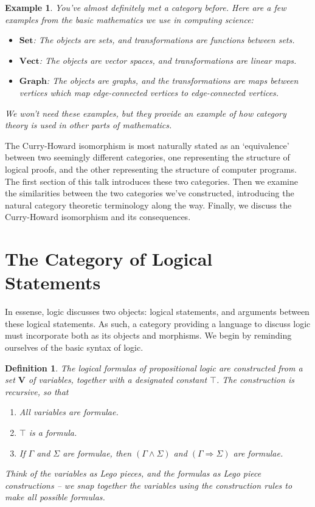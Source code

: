 \documentclass{article}
\theoremstyle{plain}
\newtheorem{definition}{Definition}
\newtheorem*{example}{Example}
\begin{document}
\begin{example}
    You've almost definitely met a category before. Here are a few examples from the basic mathematics we use in computing science:
    \begin{itemize}
        \item $\mathbf{Set}$: The objects are sets, and transformations are functions between sets.
        \item $\mathbf{Vect}$: The objects are vector spaces, and transformations are linear maps.
        \item $\mathbf{Graph}$: The objects are graphs, and the transformations are maps between vertices which map edge-connected vertices to edge-connected vertices.
    \end{itemize}
    We won't need these examples, but they provide an example of how category theory is used in other parts of mathematics.
\end{example}

The Curry-Howard isomorphism is most naturally stated as an `equivalence' between two seemingly different categories, one representing the structure of logical proofs, and the other representing the structure of computer programs. The first section of this talk introduces these two categories. Then we examine the similarities between the two categories we've constructed, introducing the natural category theoretic terminology along the way. Finally, we discuss the Curry-Howard isomorphism and its consequences.

\section{The Category of Logical Statements}

In essense, logic discusses two objects: logical statements, and arguments between these logical statements. As such, a category providing a language to discuss logic must incorporate both as its objects and morphisms. We begin by reminding ourselves of the basic syntax of logic.

\begin{definition}
    The logical formulas of propositional logic are constructed from a set $\mathbf{V}$ of variables, together with a designated constant $\top$. The construction is recursive, so that
    \begin{enumerate}
        \item All variables are formulae.
        \item $\top$ is a formula.
        \item If $\Gamma$ and $\Sigma$ are formulae, then $(\Gamma \wedge \Sigma)$ and $(\Gamma \Rightarrow \Sigma)$ are formulae.
    \end{enumerate}
    Think of the variables as Lego pieces, and the formulas as Lego piece constructions -- we snap together the variables using the construction rules to make all possible formulas.
\end{definition}
\end{document}
